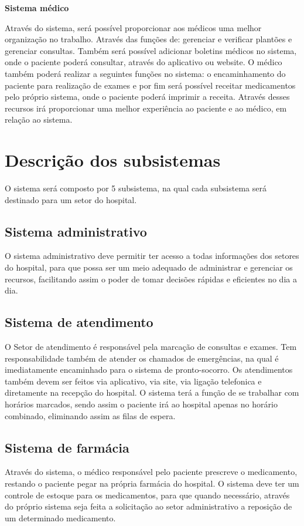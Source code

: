 \textbf{Sistema médico} 

Através do sistema, será possível proporcionar aos médicos uma melhor organização no trabalho. Através das funções de: gerenciar e verificar plantões e gerenciar consultas. Também será possível adicionar boletins médicos no sistema, onde o paciente poderá consultar, através do aplicativo ou website. O médico também poderá realizar a seguintes funções no sistema: o encaminhamento do paciente para realização de exames e por fim será possível receitar medicamentos pelo próprio sistema, onde o paciente poderá imprimir a receita. Através desses recursos irá proporcionar uma melhor experiência ao paciente e ao médico, em relação ao sistema.
 
 
  \section{Descrição dos subsistemas}
  O sistema será composto por 5 subsistema, na qual cada subsistema será destinado para um setor do hospital.
        \subsection{Sistema administrativo}
 O sistema administrativo deve permitir ter acesso a todas informações dos setores do hospital, para que possa ser um meio adequado de administrar e gerenciar os recursos, facilitando assim o poder de tomar decisões rápidas e eficientes no dia a dia.

        \subsection{Sistema de atendimento}
O Setor de atendimento é responsável pela marcação de consultas e exames. Tem   responsabilidade também de atender os chamados de emergências, na qual é imediatamente encaminhado para o sistema de pronto-socorro. Os atendimentos também devem ser feitos via aplicativo, via site, via ligação telefonica e diretamente na recepção do hospital. O sistema terá a função de se trabalhar com horários marcados, sendo assim o paciente irá ao hospital apenas no horário combinado, eliminando assim as filas de espera.
        \subsection{Sistema de farmácia}
Através do sistema, o médico responsável pelo paciente prescreve o medicamento, restando o paciente pegar na própria farmácia do hospital.
O sistema deve ter um controle de estoque para os medicamentos, para que quando necessário, através do próprio sistema seja feita a solicitação ao setor administrativo a reposição de um determinado medicamento.


